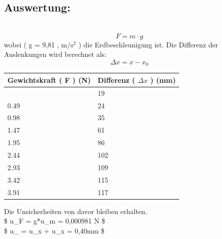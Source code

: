 \documentclass[11pt]{article}
\begin{document}
    \subsection{Auswertung:}\\
    \[ F = m \cdot g \]
    wobei ( g = 9,81 , \(\mathrm{m/s^2}\) ) die Erdbeschleunigung ist. Die
    Differenz der Auslenkungen wird berechnet als:
    \[ \Delta x = x - x_0 \]

    \begin{longtable}[]{@{}ll@{}}
    \toprule\noalign{}
    Gewichtskraft ( F ) (N) & Differenz ( \(\Delta x\) ) (mm) \\
    \midrule\noalign{}
    \endhead
    \bottomrule\noalign{}
    \endlastfoot
    0.24 & 19 \\
    0.49 & 24 \\
    0.98 & 35 \\
    1.47 & 61 \\
    1.95 & 86 \\
    2.44 & 102 \\
    2.93 & 109 \\
    3.42 & 115 \\
    3.91 & 117 \\
    \end{longtable}
    
    Die Unsicherheiten von davor bleiben erhalten.\\
    \$ u\_F = g*u\_m = 0,000981 N \$\\
    \$ u\_ = u\_x + u\_x = 0,40mm \$
\end{document}
